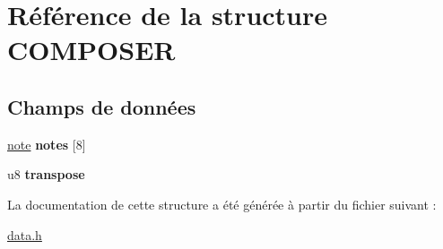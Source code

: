 \hypertarget{struct_c_o_m_p_o_s_e_r}{
\section{Référence de la structure COMPOSER}
\label{struct_c_o_m_p_o_s_e_r}
}
\subsection*{Champs de données}
\begin{DoxyCompactItemize}
\item 
\hypertarget{struct_c_o_m_p_o_s_e_r_a9107f192a1f0c96f4bc8aa34af253abf}{
\hyperlink{struct_n_o_t_e}{note} {\bfseries notes} \mbox{[}8\mbox{]}}
\label{struct_c_o_m_p_o_s_e_r_a9107f192a1f0c96f4bc8aa34af253abf}

\item 
\hypertarget{struct_c_o_m_p_o_s_e_r_a841401a367ef1cd53370b5c66363bdc9}{
u8 {\bfseries transpose}}
\label{struct_c_o_m_p_o_s_e_r_a841401a367ef1cd53370b5c66363bdc9}

\end{DoxyCompactItemize}


La documentation de cette structure a été générée à partir du fichier suivant :\begin{DoxyCompactItemize}
\item 
\hyperlink{data_8h}{data.h}\end{DoxyCompactItemize}
